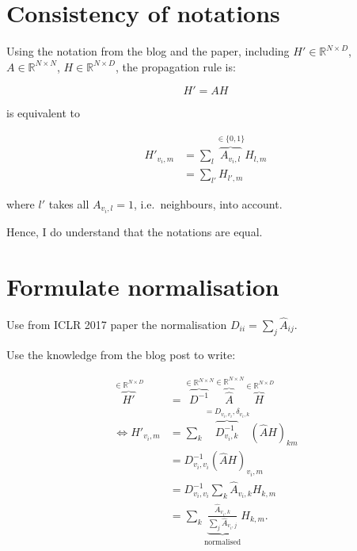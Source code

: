 \section{Consistency of notations}%
\label{sec:consistency}

Using the notation from the blog and the paper, including $H'\in\mathbb{R}^{N\times D}$, $A\in\mathbb{R}^{N\times N}$, $H\in\mathbb{R}^{N\times D}$, the propagation rule is:

\begin{equation}
	H' = A H
\end{equation}

is equivalent to

\begin{equation}
	\begin{split}
		H'_{v_i, m} & = \sum_l \overbrace{A_{v_i, l}}^{\in \{0, 1\}} H_{l, m} \\
		            & = \sum_{l'} H_{l',m}
	\end{split}
\end{equation}

where $l'$ takes all $A_{v_i,l}=1$, i.e.\ neighbours, into account.

Hence, I do understand that the notations are equal.

\section{Formulate normalisation}

Use from ICLR 2017 paper the normalisation $D_{ii} = \sum_j \hat{A}_{ij}$.

Use the knowledge from the blog post to write:

\begin{equation}
	\begin{split}
		\overbrace{H'}^{\in \mathbb{R}^{N\times D}} & = \overbrace{D^{-1}}^{\in\mathbb{R}^{N\times N}} \overbrace{\hat{A}}^{\in \mathbb{R}^{N\times N}} \overbrace{H}^{\in\mathbb{R}^{N\times D}} \\
		\Leftrightarrow H'_{v_i, m} & = \sum_k \overbrace{D^{-1}_{v_i,k}}^{=D_{v_i,v_i}, \delta_{v_i, k}} {(\hat{A} H)}_{km} \\
			& = D^{-1}_{v_i, v_i} (\hat{A} H)_{v_i, m} \\
			& = D^{-1}_{{v}_i, v_i} \sum_k \hat{A}_{v_i, k} H_{k, m} \\
			& = \sum_k \underbrace{\frac{\hat{A}_{v_i, k}}{\sum_j \hat{A}_{v_i, j}}}_{\text{normalised}} H_{k, m}.
	\end{split}
\end{equation}

